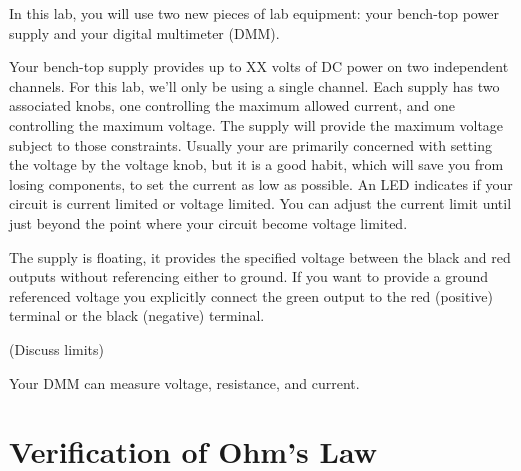 
In this lab, you will use two new pieces of lab equipment:  your bench-top power supply and your digital multimeter (DMM).

Your bench-top supply provides up to XX volts of DC power on two independent channels.  For this lab, we'll only be using a single channel.  Each supply has two associated knobs, one controlling the maximum allowed current, and one controlling the maximum voltage.  The supply will provide the maximum voltage subject to those constraints.  Usually your are primarily concerned with setting the voltage by the voltage knob, but it is a good habit, which will save you from losing components, to set the current as low as possible.  An LED indicates if your circuit is current limited or voltage limited.  You can adjust the current limit until just beyond the point where your circuit become voltage limited.

The supply is floating, it provides the specified voltage between the black and red outputs without referencing either to ground.  If you want to provide a ground referenced voltage you explicitly connect the green output to the red (positive) terminal or the black (negative) terminal.

(Discuss limits)

Your DMM can measure voltage, resistance, and current.






\section{Verification of Ohm's Law}

